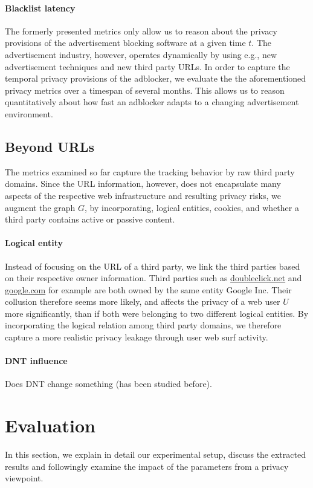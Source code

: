 \documentclass{sig-alternate}
\begin{document}
\paragraph{Blacklist latency}
The formerly presented metrics only allow us to reason about the privacy provisions of the advertisement blocking software at a given time $t$. The advertisement industry, however, operates dynamically by using e.g., new advertisement techniques and new third party URLs. In order to capture the temporal privacy provisions of the adblocker, we evaluate the the aforementioned privacy metrics over a timespan of several months. This allows us to reason quantitatively about how fast an adblocker adapts to a changing advertisement environment.

\subsection{Beyond URLs}
The metrics examined so far capture the tracking behavior by raw third party domains. Since the URL information, however, does not encapsulate many aspects of the respective web infrastructure and resulting privacy risks, we augment the graph $G$, by incorporating, logical entities, cookies, and whether a third party contains active or passive content.

\paragraph{Logical entity}
\label{sec:logical_entity}
Instead of focusing on the URL of a third party, we link the third parties based on their respective owner information. Third parties such as \url{doubleclick.net} and \url{google.com} for example are both owned by the same entity Google Inc. Their collusion therefore seems more likely, and affects the privacy of a web user $U$ more significantly, than if both were belonging to two different logical entities. By incorporating the logical relation among third party domains, we therefore capture a more realistic privacy leakage through user web surf activity.

\paragraph{DNT influence}
Does DNT change something (has been studied before).

\section{Evaluation}
In this section, we explain in detail our experimental setup, discuss the extracted results and followingly examine the impact of the parameters from a privacy viewpoint.
\end{document}
